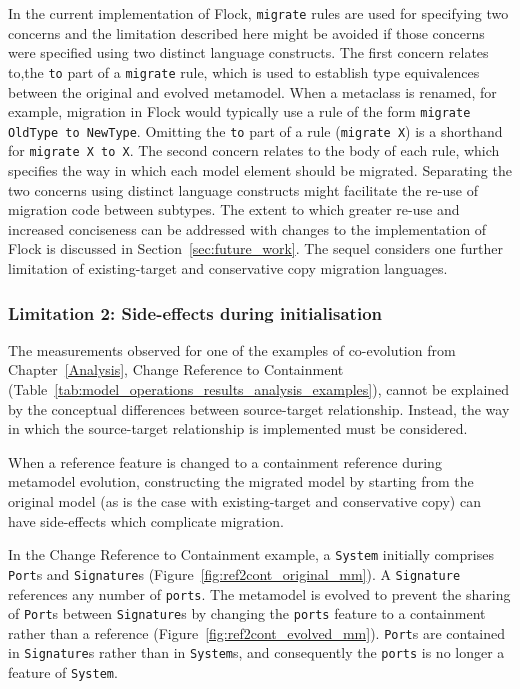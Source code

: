 In the current implementation of Flock, \texttt{migrate} rules are used for specifying two concerns and the limitation described here might be avoided if those concerns were specified using two distinct language constructs. The first concern relates to,the \texttt{to} part of a \texttt{migrate} rule, which is used to establish type equivalences between the original and evolved metamodel. When a metaclass is renamed, for example, migration in Flock would typically use a rule of the form \texttt{migrate OldType to NewType}. Omitting the \texttt{to} part of a rule (\texttt{migrate X}) is a shorthand for \texttt{migrate X to X}. The second concern relates to the body of each rule, which specifies the way in which each model element should be migrated. Separating the two concerns using distinct language constructs might facilitate the re-use of migration code between subtypes. The extent to which greater re-use and increased conciseness can be addressed with changes to the implementation of Flock is discussed in Section~\ref{sec:future_work}. The sequel considers one further limitation of existing-target and conservative copy migration languages.

\subsubsection{Limitation 2: Side-effects during initialisation}
The measurements observed for one of the examples of co-evolution from Chapter~\ref{Analysis}, Change Reference to Containment (Table~\ref{tab:model_operations_results_analysis_examples}), cannot be explained by the conceptual differences between source-target relationship. Instead, the way in which the source-target relationship is implemented must be considered.

When a reference feature is changed to a containment reference during metamodel evolution, constructing the migrated model by starting from the original model (as is the case with existing-target and conservative copy) can have side-effects which complicate migration.

In the Change Reference to Containment example, a \texttt{System} initially comprises \texttt{Port}s and \texttt{Signature}s (Figure~\ref{fig:ref2cont_original_mm}). A \texttt{Signature} references any number of \texttt{ports}. The metamodel is evolved to prevent the sharing of \texttt{Port}s between \texttt{Signature}s by changing the \texttt{ports} feature to a containment rather than a reference (Figure~\ref{fig:ref2cont_evolved_mm}). \texttt{Port}s are contained in \texttt{Signature}s rather than in \texttt{System}s, and consequently the \texttt{ports} is no longer a feature of \texttt{System}.

